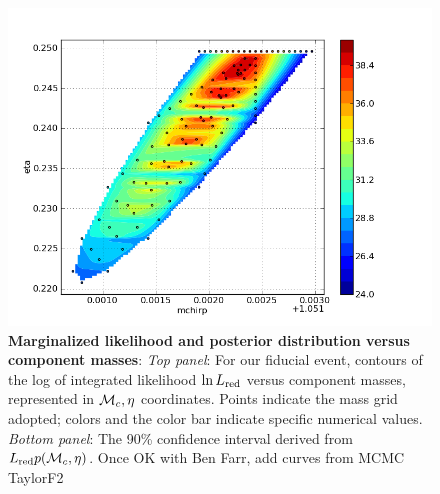 \documentclass[twocolumn,prd,nofootinbib]{revtex4}
\newcommand\editremark[1]{{\color{red} #1}}
\newcommand\mc{{{\cal M}_c}}
\begin{document}
\begin{figure}
\includegraphics[width=\columnwidth]{../Figures/v2runs_coinc_id_833_mchirp_eta_logevidence}
\caption{\label{fig:FiducialEvent:LikelihoodVersusMchirpEta}\textbf{Marginalized likelihood and posterior distribution
    versus component masses}: \emph{Top panel}: 
For our fiducial event,
  contours of the log of integrated likelihood $\ln L_{\rm red}$ versus component masses, represented in $\mc,\eta$
  coordinates.  Points indicate the mass grid adopted; colors and the color bar indicate specific numerical values.   
\emph{Bottom panel}: The 90\% confidence interval derived from $L_{\rm red} p(\mc,\eta)$.  
 \editremark{Once OK with Ben Farr, add curves from MCMC TaylorF2}
}
\end{figure}
\end{document}
